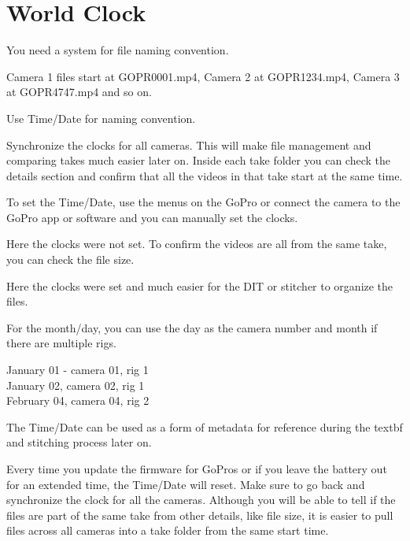 \chapter{World Clock}
\pagecolor{white}
\label{chap:5}
\begin{fullwidth}


\problem

{\large You need a system for file naming convention. \par}

Camera 1 files start at GOPR0001.mp4, Camera 2 at GOPR1234.mp4, Camera 3 at GOPR4747.mp4 and so on. 


\solution

{\large Use Time/Date for naming convention. \par}

Synchronize the clocks for all cameras. This will make file management and comparing takes much easier later on. Inside each take folder you can check the details section and confirm that all the videos in that take start at the same time. 

To set the Time/Date, use the menus on the GoPro or connect the camera to the GoPro app or software and you can manually set the clocks.


Here the clocks were not set. To confirm the videos are all from the same take, you can check the file size. 


Here the clocks were set and much easier for the DIT or stitcher to organize the files.


For the month/day, you can use the day as the camera number and month if there are multiple rigs. 

January 01 - camera 01, rig 1
\\
January 02, camera 02, rig 1
\\
February 04, camera 04, rig 2


The Time/Date can be used as a form of metadata for reference during the textbf{} and stitching process later on. 

\tip Every time you update the firmware for GoPros or if you leave the battery out for an extended time, the Time/Date will reset. Make sure to go back and synchronize the clock for all the cameras. Although you will be able to tell if the files are part of the same take from other details, like file size, it is easier to pull files across all cameras into a take folder from the same start time. 




\clearpage
\end{fullwidth}
